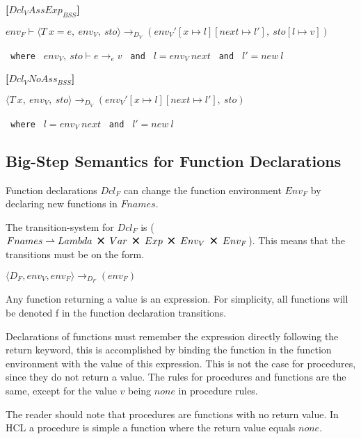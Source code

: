 \textbf{[$Dcl_VAssExp_{BSS}$]}\\
\begin{center}
	\begin{math}
		{env_F \vdash \langle T\ x = e,\ env_V,\ sto \rangle \rightarrow_{D_V} (env_V'[x \mapsto l][next \mapsto l'],\ sto[l \mapsto v])}
	\end{math}
	
	\texttt{ where } $env_V,\ sto \vdash e \rightarrow_e v$
	\texttt{ and } $l = env_V\ next$
	\texttt{ and } $l' = new\ l$
\end{center}

\textbf{[$Dcl_VNoAss_{BSS}$]}\\
\begin{center}
	\begin{math}
		{\langle T\ x,\ env_V,\ sto \rangle \rightarrow_{D_V} (env_V'[x \mapsto l][next \mapsto l'],\ sto)}
	\end{math}
	
	\texttt{ where } $l = env_V\ next$
	\texttt{ and } $l' = new\ l$
\end{center}

\subsection{Big-Step Semantics for Function Declarations}
Function declarations $Dcl_F$ can change the function environment $Env_F$ by declaring new functions in $Fnames$.

The transition-system for $Dcl_F$ is ($Fnames \rightharpoonup Lambda\ \Cross\ Var\ \Cross\ Exp\ \Cross\ Env_V\ \Cross\ Env_F$).
This means that the transitions must be on the form.

\begin{center}
	$\langle D_F, env_V, env_F \rangle \rightarrow_{D_F} (env_F)$
\end{center}

Any function returning a value is an expression.
For simplicity, all functions will be denoted f in the function declaration transitions.

Declarations of functions must remember the expression directly following the return keyword, this is accomplished by binding the function in the function environment with the value of this expression.
This is not the case for procedures, since they do not return a value.
The rules for procedures and functions are the same, except for the value $v$ being $none$ in procedure rules.

The reader should note that procedures are functions with no return value.
In HCL a procedure is simple a function where the return value equals $none$.

